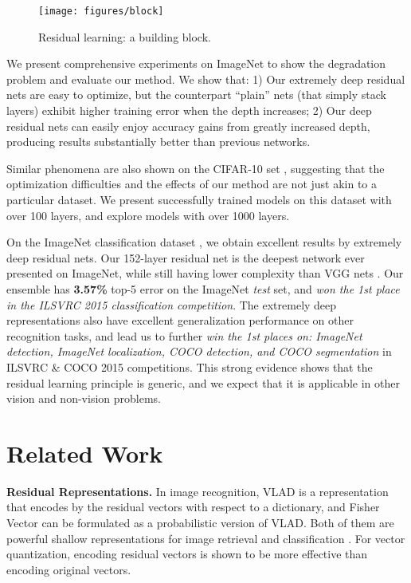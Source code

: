 \begin{figure}[t]
\centering
\hspace{48pt}
\texttt{[image: figures/block]}
\vspace{-.5em}
\caption{Residual learning: a building block.}
\label{fig:block}
\vspace{-1em}
\end{figure}

We present comprehensive experiments on ImageNet \cite{Russakovsky2014} to show the degradation problem and evaluate our method.
We show that: 1) Our extremely deep residual nets are easy to optimize, but the counterpart ``plain'' nets (that simply stack layers) exhibit higher training error when the depth increases; 2) Our deep residual nets can easily enjoy accuracy gains from greatly increased depth, producing results substantially better than previous networks.

Similar phenomena are also shown on the CIFAR-10 set \cite{Krizhevsky2009}, suggesting that the optimization difficulties and the effects of our method are not just akin to a particular dataset. We present successfully trained models on this dataset with over 100 layers, and explore models with over 1000 layers.

On the ImageNet classification dataset \cite{Russakovsky2014}, we obtain excellent results by extremely deep residual nets.
Our 152-layer residual net is the deepest network ever presented on ImageNet, while still having lower complexity than VGG nets \cite{Simonyan2015}. Our ensemble has \textbf{3.57\%} top-5 error on the ImageNet \emph{test} set, and \emph{won the 1st place in the ILSVRC 2015 classification competition}. The extremely deep representations also have excellent generalization performance on other recognition tasks, and lead us to further \emph{win the 1st places on: ImageNet detection, ImageNet localization, COCO detection, and COCO segmentation} in ILSVRC \& COCO 2015 competitions. This strong evidence shows that the residual learning principle is generic, and we expect that it is applicable in other vision and non-vision problems.


\section{Related Work}

\noindent\textbf{Residual Representations.}
In image recognition, VLAD \cite{Jegou2012} is a representation that encodes by the residual vectors with respect to a dictionary, and Fisher Vector \cite{Perronnin2007} can be formulated as a probabilistic version \cite{Jegou2012} of VLAD.
Both of them are powerful shallow representations for image retrieval and classification \cite{Chatfield2011,Vedaldi2008}.
For vector quantization, encoding residual vectors \cite{Jegou2011} is shown to be more effective than encoding original vectors.

